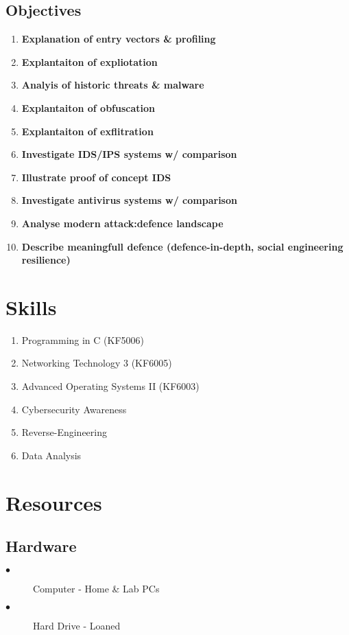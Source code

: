 \subsection{Objectives}
\begin{enumerate}
	\item \textbf{Explanation of entry vectors & profiling}
	\item \textbf{Explantaiton of expliotation}
	\item \textbf{Analyis of historic threats & malware}
	\item \textbf{Explantaiton of obfuscation}
	\item \textbf{Explantaiton of exflitration}
	\item \textbf{Investigate IDS/IPS systems w/ comparison}
	\item \textbf{Illustrate proof of concept IDS}
	\item \textbf{Investigate antivirus systems w/ comparison}
	\item \textbf{Analyse modern attack:defence landscape}
	\item \textbf{Describe meaningfull defence (defence-in-depth, social engineering resilience)}
\end{enumerate}


\section{Skills}
\begin{enumerate}
	\item Programming in C (KF5006)
	\item Networking Technology 3 (KF6005)
	\item Advanced Operating Systems II (KF6003)
	\item Cybersecurity Awareness
	\item Reverse-Engineering
	\item Data Analysis
\end{enumerate}

\section{Resources}
\subsection{Hardware}
\begin{description}
	\item[$\bullet$] Computer - Home & Lab PCs
	\item[$\bullet$] Hard Drive - Loaned
\end{description}

